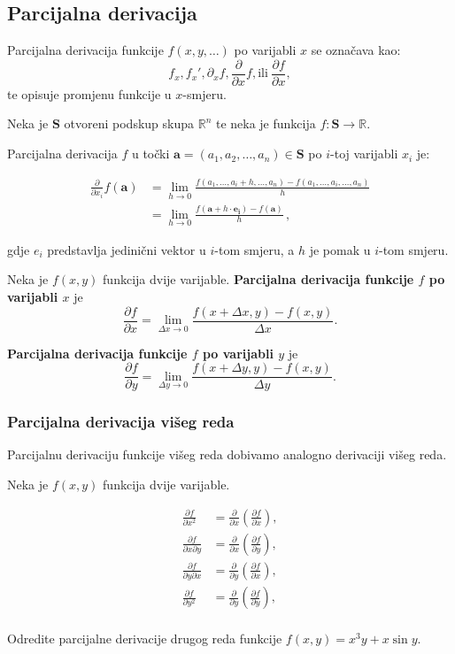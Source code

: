 \subsection{Parcijalna derivacija}

Parcijalna derivacija funkcije $f(x,y,\dots)$ po varijabli $x$ se označava kao:
$$
f_x, f_x', \partial_x f, \frac{\partial}{\partial x}f, \text{ili}\ \frac{\partial f}{\partial x},
$$
te opisuje promjenu funkcije u $x$-smjeru.

\begin{definition}
    \label{def:diff_partial}
    Neka je $\mathbf{S}$ otvoreni podskup skupa $\mathbb{R}^n$ te neka je
    funkcija $f:\mathbf{S}\to \mathbb{R}$.

    Parcijalna derivacija $f$ u točki $\mathbf{a}=(a_1, a_2, \dots,
    a_n)\in\mathbf{S}$ po $i$-toj varijabli $x_i$ je:
    
    \begin{align*}
        \frac{\partial }{\partial x_i }f(\mathbf{a}) & = \lim_{h \to 0} \frac{f(a_1, \ldots , a_i+h, \ldots ,a_n) -
        f(a_1, \ldots, a_i, \dots ,a_n)}{h} \\ 
        & = \lim_{h \to 0} \frac{f(\mathbf{a}+h \cdot \mathbf{e_i}) - f(\mathbf{a})}{h}\,,
    \end{align*}

    gdje $e_i$ predstavlja jedinični vektor u $i$-tom smjeru, a $h$ je pomak u
    $i$-tom smjeru.
\end{definition}

Neka je $f(x,y)$ funkcija dvije varijable. \textbf{Parcijalna derivacija
funkcije $f$ po varijabli $x$} je
$$
  \frac{\partial f}{\partial x} = \lim_{\Delta x\to 0} \frac{f(x+\Delta x,y)-f(x,y)}{\Delta x}.
$$

\textbf{Parcijalna derivacija funkcije $f$ po varijabli $y$} je
$$
  \frac{\partial f}{\partial y} = \lim_{\Delta y\to 0} \frac{f(x+\Delta y,y)-f(x,y)}{\Delta y}.
$$

\subsubsection{Parcijalna derivacija višeg reda}

Parcijalnu derivaciju funkcije višeg reda dobivamo analogno derivaciji višeg
reda.

Neka je $f(x,y)$ funkcija dvije varijable.

\begin{align*}
  \frac{\partial f}{\partial x^2} &= \frac{\partial}{\partial x} (\frac{\partial f}{\partial x}),\\
  \frac{\partial f}{\partial x \partial y} &= \frac{\partial}{\partial x} (\frac{\partial f}{\partial y}),\\
  \frac{\partial f}{\partial y \partial x} &= \frac{\partial}{\partial y} (\frac{\partial f}{\partial x}),\\
  \frac{\partial f}{\partial y^2} &= \frac{\partial}{\partial y} (\frac{\partial f}{\partial y}),\\
\end{align*}

\begin{example}
  Odredite parcijalne derivacije drugog reda funkcije $f(x,y)=x^3y+x\sin y$.
\end{example}
